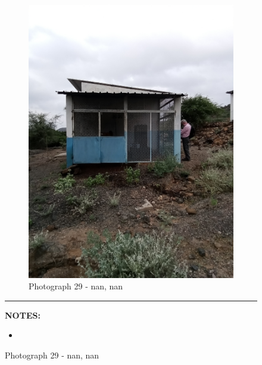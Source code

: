 \documentclass[12pt, letterpaper]{article}
\begin{document}
\begin{figure}[h]
{{                \begin{subfigure}{\linewidth}
                    \centering
                    \includegraphics[width=0.37\textheight, angle=-90]{photos/8.png}
                    \captionsetup{width=0.8\linewidth}
                    \caption{Photograph 29 - nan, nan}
                \end{subfigure}
                    \vspace{1mm}
                    \hrule
                \begin{minipage}[c][4.5cm][t]{1\textwidth} 
                    \begin{minipage}[t][2cm][t]{0.5\textwidth} 
	 				\vspace{2mm}
					\centering
					\textbf{\small{NOTES:}} \\ 
					\raggedright 
					\begin{itemize}
            					\item \footnotesize{}
       				 	\end{itemize}

\end{minipage}
\end{minipage}}}
\end{figure}
\end{document}
